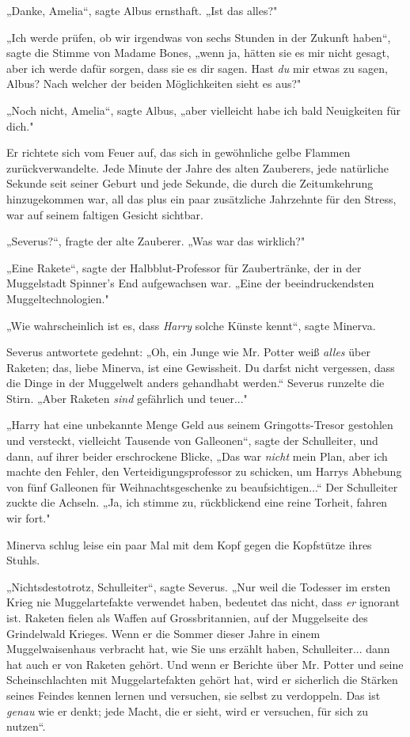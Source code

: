 {„Danke, Amelia“, sagte Albus ernsthaft. „Ist das alles?"

„Ich werde prüfen, ob wir irgendwas von sechs Stunden in der Zukunft haben“, sagte die Stimme von Madame Bones, „wenn ja, hätten sie es mir nicht gesagt, aber ich werde dafür sorgen, dass sie es dir sagen. Hast \emph{du} mir etwas zu sagen, Albus? Nach welcher der beiden Möglichkeiten sieht es aus?"

„Noch nicht, Amelia“, sagte Albus, „aber vielleicht habe ich bald Neuigkeiten für dich."

Er richtete sich vom Feuer auf, das sich in gewöhnliche gelbe Flammen zurückverwandelte. Jede Minute der Jahre des alten Zauberers, jede natürliche Sekunde seit seiner Geburt und jede Sekunde, die durch die Zeitumkehrung hinzugekommen war, all das plus ein paar zusätzliche Jahrzehnte für den Stress, war auf seinem faltigen Gesicht sichtbar.

„Severus?“, fragte der alte Zauberer. „Was war das wirklich?"

„Eine Rakete“, sagte der Halbblut-Professor für Zaubertränke, der in der Muggelstadt Spinner's End aufgewachsen war. „Eine der beeindruckendsten Muggeltechnologien."

„Wie wahrscheinlich ist es, dass \emph{Harry} solche Künste kennt“, sagte Minerva.

Severus antwortete gedehnt: „Oh, ein Junge wie Mr. Potter weiß \emph{alles} über Raketen; das, liebe Minerva, ist eine Gewissheit. Du darfst nicht vergessen, dass die Dinge in der Muggelwelt anders gehandhabt werden.“ Severus runzelte die Stirn. „Aber Raketen \emph{sind} gefährlich und teuer..."

„Harry hat eine unbekannte Menge Geld aus seinem Gringotts-Tresor gestohlen und versteckt, vielleicht Tausende von Galleonen“, sagte der Schulleiter, und dann, auf ihrer beider erschrockene Blicke, „Das war \emph{nicht} mein Plan, aber ich machte den Fehler, den Verteidigungsprofessor zu schicken, um Harrys Abhebung von fünf Galleonen für Weihnachtsgeschenke zu beaufsichtigen...“ Der Schulleiter zuckte die Achseln. „Ja, ich stimme zu, rückblickend eine reine Torheit, fahren wir fort."

Minerva schlug leise ein paar Mal mit dem Kopf gegen die Kopfstütze ihres Stuhls.

„Nichtsdestotrotz, Schulleiter“, sagte Severus. „Nur weil die Todesser im ersten Krieg nie Muggelartefakte verwendet haben, bedeutet das nicht, dass \emph{er} ignorant ist. Raketen fielen als Waffen auf Grossbritannien, auf der Muggelseite des Grindelwald Krieges. Wenn er die Sommer dieser Jahre in einem Muggelwaisenhaus verbracht hat, wie Sie uns erzählt haben, Schulleiter... dann hat auch er von Raketen gehört. Und wenn er Berichte über Mr. Potter und seine Scheinschlachten mit Muggelartefakten gehört hat, wird er sicherlich die Stärken seines Feindes kennen lernen und versuchen, sie selbst zu verdoppeln. Das ist \emph{genau} wie er denkt; jede Macht, die er sieht, wird er versuchen, für sich zu nutzen“.

}
